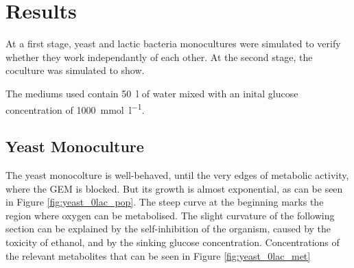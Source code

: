 \section{Results}\label{sec:results}
	At a first stage, yeast and lactic bacteria monocultures were simulated to verify whether they work independantly of each other.
	At the second stage, the coculture was simulated to show.
	
	The mediums used contain \SI{50}{\litre} of water mixed with an inital glucose concentration of \SI{1000}{\milli\mole\per\litre}.
	\subsection{Yeast Monoculture}
		The yeast monocolture is well-behaved, until the very edges of metabolic activity, where the GEM is blocked.
		But its growth is almost exponential, as can be seen in Figure \ref{fig:yeast_0lac_pop}.
		The steep curve at the beginning marks the region where oxygen can be metabolised.
		The slight curvature of the following section can be explained by the self-inhibition of the organism,
		caused by the toxicity of ethanol, and by the sinking glucose concentration.
		Concentrations of the relevant metabolites that can be seen in Figure \ref{fig:yeast_0lac_met}
		
